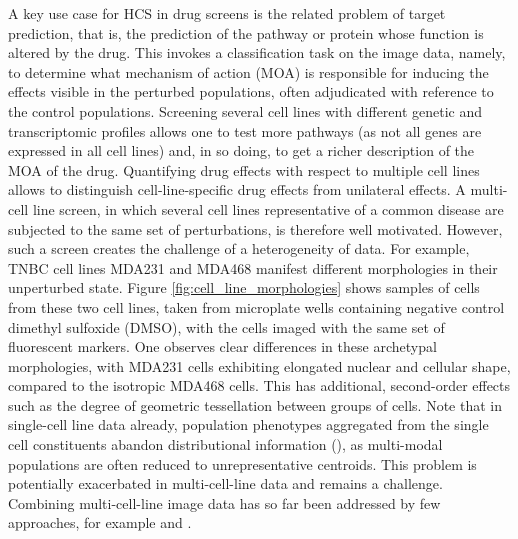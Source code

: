 A key use case for HCS in drug screens is the related problem of target prediction, that is, the prediction of the pathway or protein whose function is altered by the drug. This invokes a classification task on the image data, namely, to determine what mechanism of action (MOA) is responsible for inducing the effects visible in the perturbed populations, often adjudicated with reference to the control populations. Screening several cell lines with different genetic and transcriptomic profiles allows one to test more pathways (as not all genes are expressed in all cell lines) and, in so doing, to get a richer description of the MOA of the drug. Quantifying drug effects with respect to multiple cell lines allows to distinguish cell-line-specific drug effects from unilateral effects. A multi-cell line screen, in which several cell lines representative of a common disease are subjected to the same set of perturbations, is therefore well motivated. However, such a screen creates the challenge of a heterogeneity of data. For example, TNBC cell lines MDA231 and MDA468 manifest different morphologies in their unperturbed state. Figure \ref{fig:cell_line_morphologies} shows samples of cells from these two cell lines, taken from microplate wells containing negative control dimethyl sulfoxide (DMSO), with the cells imaged with the same set of fluorescent markers. One observes clear differences in these archetypal morphologies, with MDA231 cells exhibiting elongated nuclear and cellular shape, compared to the isotropic MDA468 cells. This has additional, second-order effects such as the degree of geometric tessellation between groups of cells. Note that in single-cell line data already, population phenotypes aggregated from the single cell constituents abandon distributional information (\cite{altschuler2010cellular}), as multi-modal populations are often reduced to unrepresentative centroids. This problem is potentially exacerbated in multi-cell-line data and remains a challenge. Combining multi-cell-line image data has so far been addressed by few approaches, for example \cite{rose2018compound} and \cite{warchal2016development}.


